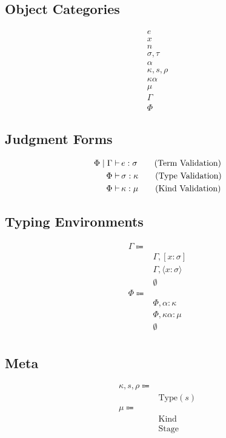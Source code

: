 \documentclass {article}
\begin{document}
\subsection{Object Categories}

\begin{align*}
e \tag{Terms} \\
x \tag{Variables} \\
n \tag{Numbers} \\
\sigma, \tau \tag{Types} \\
\alpha \tag{Type Variables} \\
\kappa, s, \rho \tag{Kinds} \\
\kappa \alpha \tag{Kind Variables} \\
\mu \tag{Sorts} \\
\Gamma \tag{Type Environment} \\
\Phi \tag{Misc Environment}
\end{align*}


\subsection{Judgment Forms}
\begin{align*}
\Phi \mid \Gamma \vdash \, & e : \sigma \tag{\text{Term Validation}} \\
\Phi \vdash \, & \sigma : \kappa \tag{\text{Type Validation}} \\
\Phi \vdash \, & \kappa : \mu \tag{Kind Validation} \\
\end{align*}

\subsection{Typing Environments}
\begin{align*}
\Gamma \Coloneqq & \\
& \Gamma, [x : \sigma] \\
& \Gamma, \langle x : \sigma \rangle \\
& \emptyset \\
\Phi \Coloneqq & \\
& \Phi, \alpha : \kappa \\
& \Phi, \kappa \alpha : \mu \\
& \emptyset \\
\end{align*}

\subsection{Meta}
\begin{align*}
\kappa, s, \rho \Coloneqq & \\
& \text{Type} (s) \tag{Type} \\
\mu \Coloneqq & \\
& \text{Kind} \\
& \text{Stage} \\
\end{align*}
\end{document}
